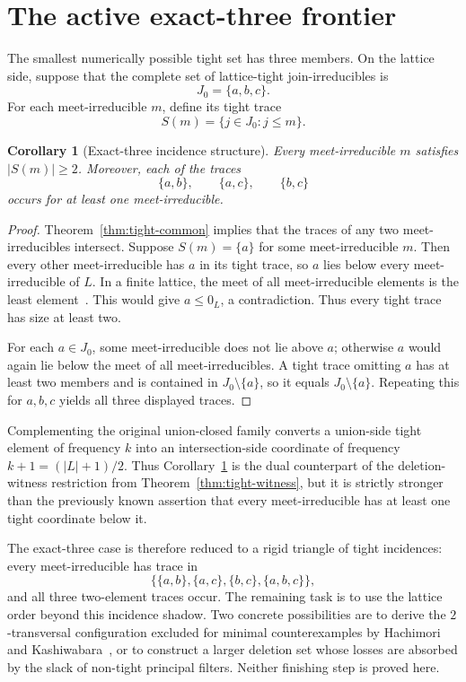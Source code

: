 \documentclass[11pt]{amsart}
\newtheorem{corollary}[theorem]{Corollary}
\theoremstyle{definition}
\theoremstyle{remark}
\begin{document}
\section{The active exact-three frontier}\label{sec:frontier}

The smallest numerically possible tight set has three members. On the lattice side, suppose that the complete set of lattice-tight join-irreducibles is
\[
  J_0=\{a,b,c\}.
\]
For each meet-irreducible $m$, define its tight trace
\[
  S(m)=\{j\in J_0:j\le m\}.
\]

\begin{corollary}[Exact-three incidence structure]\label{cor:exact-three}
Every meet-irreducible $m$ satisfies $|S(m)|\ge2$. Moreover, each of the traces
\[
  \{a,b\},\qquad \{a,c\},\qquad \{b,c\}
\]
occurs for at least one meet-irreducible.
\end{corollary}

\begin{proof}
Theorem~\ref{thm:tight-common} implies that the traces of any two meet-irreducibles intersect. Suppose $S(m)=\{a\}$ for some meet-irreducible $m$. Then every other meet-irreducible has $a$ in its tight trace, so $a$ lies below every meet-irreducible of $L$. In a finite lattice, the meet of all meet-irreducible elements is the least element~\cite[Section~I.3]{Gratzer2011}. This would give $a\le0_L$, a contradiction. Thus every tight trace has size at least two.

For each $a\in J_0$, some meet-irreducible does not lie above $a$; otherwise $a$ would again lie below the meet of all meet-irreducibles. A tight trace omitting $a$ has at least two members and is contained in $J_0\setminus\{a\}$, so it equals $J_0\setminus\{a\}$. Repeating this for $a,b,c$ yields all three displayed traces.
\end{proof}

Complementing the original union-closed family converts a union-side tight element of frequency $k$ into an intersection-side coordinate of frequency $k+1=(|L|+1)/2$. Thus Corollary~\ref{cor:exact-three} is the dual counterpart of the deletion-witness restriction from Theorem~\ref{thm:tight-witness}, but it is strictly stronger than the previously known assertion that every meet-irreducible has at least one tight coordinate below it.

The exact-three case is therefore reduced to a rigid triangle of tight incidences: every meet-irreducible has trace in
\[
  \bigl\{\{a,b\},\{a,c\},\{b,c\},\{a,b,c\}\bigr\},
\]
and all three two-element traces occur. The remaining task is to use the lattice order beyond this incidence shadow. Two concrete possibilities are to derive the $2$-transversal configuration excluded for minimal counterexamples by Hachimori and Kashiwabara~\cite{HachimoriKashiwabara2024}, or to construct a larger deletion set whose losses are absorbed by the slack of non-tight principal filters. Neither finishing step is proved here.
\end{document}
